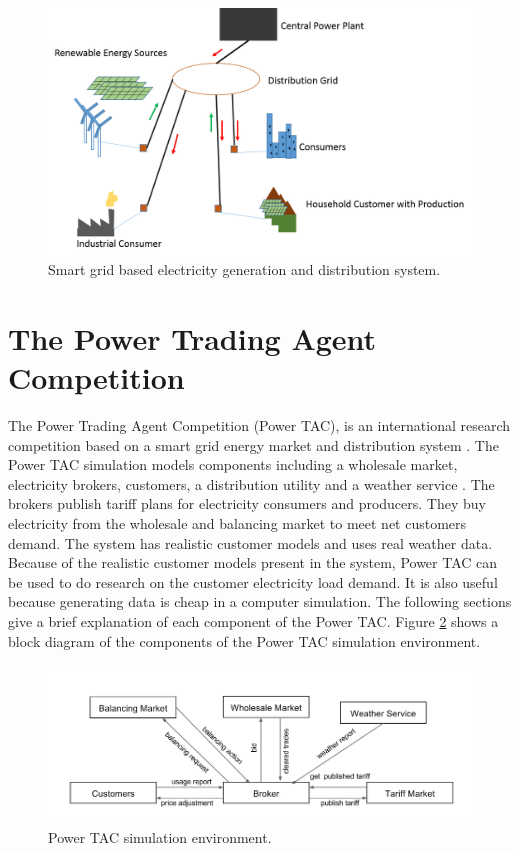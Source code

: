 \begin{figure}[h]
  \includegraphics[width=\linewidth]{smart-grid.png}
  \caption{Smart grid based electricity generation and distribution system.}
  \label{fig:smartgrid}
\end{figure}

\section{The Power Trading Agent Competition}

The Power Trading Agent Competition (Power TAC), is an international research competition based on a smart grid energy market and distribution system \cite{ketter2013power, ketter20162016}. The Power TAC simulation models components including a wholesale market, electricity brokers, customers, a distribution utility and a weather service \cite{ketter20162016}. The brokers publish tariff plans for electricity consumers and producers. They buy electricity from the wholesale and balancing market to meet net customers demand. The system has realistic customer models and uses real weather data. Because of the realistic customer models present in the system, Power TAC can be used to do research on the customer electricity load demand. It is also useful because generating data is cheap in a computer simulation. The following sections give a brief explanation of each component of the Power TAC. Figure \ref{fig:simulation-environment}  shows a block diagram of the components of the Power TAC simulation environment.

\begin{figure}[!h]
  \includegraphics[width=\linewidth]{simulation-environment.png}
  \caption{Power TAC simulation environment.}
  \label{fig:simulation-environment}
\end{figure}

